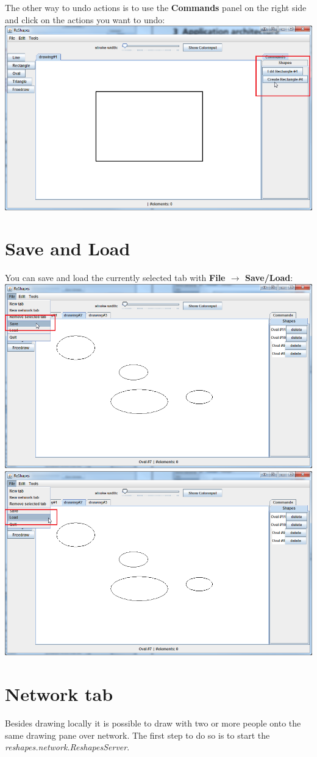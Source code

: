 The other way to undo actions is to use the \textbf{Commands} panel on the right side and click on the actions you want to undo: \\
\includegraphics[width=1\textwidth]{img/undo_action_2}

\section{Save and Load}

You can save and load the currently selected tab with \textbf{File $\rightarrow$ Save/Load}: \\
\includegraphics[width=1\textwidth]{img/save} \\
\includegraphics[width=1\textwidth]{img/load} \\

\section{Network tab}

Besides drawing locally it is possible to draw with two or more people onto the same drawing pane over network.
The first step to do so is to start the \textit{reshapes.network.ReshapesServer}. 
